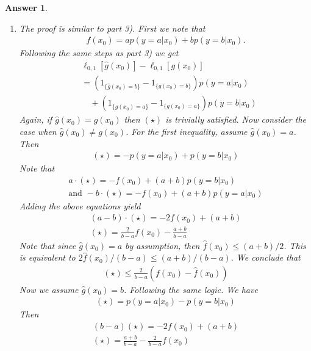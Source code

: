 \documentclass[12pt]{article}
\theoremstyle{colon}
\newtheorem*{answer}{Answer}
\begin{document}
\begin{answer}
\begin{enumerate}[label=\arabic*)]
    \item The proof is similar to part 3). First we note that
      \begin{gather*}
        f(x_0) = a p(y = a | x_0) + b p(y = b | x_0).
      \end{gather*}
      Following the same steps as part 3) we get
      \begin{align*}
        & \ell_{0,1}[\widehat{g}(x_0)] - \ell_{0,1}[g(x_0)] \\
        &= (1_{\{ \widehat{g}(x_0)= b \}} - 1_{\{ g(x_0)= b \}})p(y = a | x_0) \\
        &\quad + (1_{\{ \widehat{g}(x_0)= a \}} - 1_{\{ g(x_0)= a \}})p(y = b | x_0) \tag{$\star$}
      \end{align*}
      Again, if $\widehat{g}(x_0) = g(x_0)$ then $(\star)$ is trivially satisfied. Now consider the case when $\widehat{g}(x_0) \neq g(x_0)$. For the first inequality, assume $\widehat{g}(x_0) = a$. Then
      \begin{gather*}
        (\star) = -p(y = a | x_0) + p(y = b | x_0)
      \end{gather*}
      Note that
      \begin{gather*}
        a \cdot (\star) = -f(x_0) + (a+b)p(y=b | x_0) \\
        \text{and } -b \cdot (\star) = -f(x_0) + (a+b)p(y=a | x_0)
      \end{gather*}
      Adding the above equations yield
      \begin{gather*}
        (a-b) \cdot (\star) = -2f(x_0) + (a+b) \\
        (\star) = \frac{2}{b-a}f(x_0) - \frac{a+b}{b-a}
      \end{gather*}
      Note that since $\widehat{g}(x_0) = a$ by assumption, then $\widehat{f}(x_0) \leq (a+b)/2$. This is equivalent to $2\widehat{f}(x_0)/(b-a) \leq (a+b)/(b-a)$. We conclude that
      \begin{gather*}
        (\star) \leq \frac{2}{b-a} (f(x_0) - \widehat{f}(x_0))
      \end{gather*}
      Now we assume $\widehat{g}(x_0) = b$. Following the same logic. We have
      \begin{gather*}
        (\star) = p(y = a | x_0) - p(y = b | x_0)
      \end{gather*}
      Then
      \begin{gather*}
        (b-a)(\star) = -2f(x_0) +(a+b) \\
        (\star) = \frac{a+b}{b-a} - \frac{2}{b-a}f(x_0)
      \end{gather*}

\end{enumerate}
\end{answer}
\end{document}

